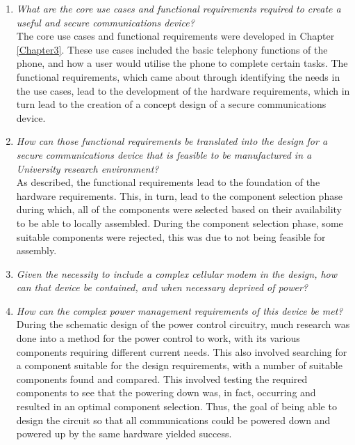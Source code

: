 \begin{enumerate}
\item \textit{What are the core use cases and functional requirements required to create a useful and secure communications device?}\\

	The core use cases and functional requirements were developed in Chapter \ref{Chapter3}. 
These use cases included the basic telephony functions of the phone, and how a user would utilise the phone to complete certain tasks. 
The functional requirements, which came about through identifying the needs in the use cases, lead to the development of the hardware requirements, which in turn lead to the creation of a concept design of a secure communications device.\\

\item \textit{How can those functional requirements be translated into the design for a secure communications device that is feasible to be manufactured in a University research environment?}\\

	As described, the functional requirements lead to the foundation of the hardware requirements. This, in turn, lead to the component selection phase during which, all of the components were selected based on their availability to be able to locally assembled.
During the component selection phase, some suitable components were rejected, this was due to not being feasible for assembly.\\

\item \textit{Given the necessity to include a complex cellular modem in the design, how can that device be contained, and when necessary deprived of power?}\\

	

\item \textit{How can the complex power management requirements of this device be met?}\\

	During the schematic design of the power control circuitry, much research was done into a method for the power control to work, with its various components requiring different current needs. 
This also involved searching for a component suitable for the design requirements, with a number of suitable components found and compared. This involved testing the required components to see that the powering down was, in fact, occurring and resulted in an optimal component selection. Thus, the goal of being able to design the circuit so that all communications could be powered down and powered up by the same hardware yielded success.\\
	

\end{enumerate}
